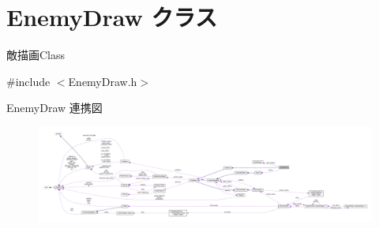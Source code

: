 \hypertarget{class_enemy_draw}{}\section{Enemy\+Draw クラス}
\label{class_enemy_draw}


敵描画\+Class  




{\ttfamily \#include $<$Enemy\+Draw.\+h$>$}



Enemy\+Draw 連携図\nopagebreak
\begin{figure}[H]
\begin{center}
\leavevmode
\includegraphics[width=350pt]{class_enemy_draw__coll__graph}
\end{center}
\end{figure}
